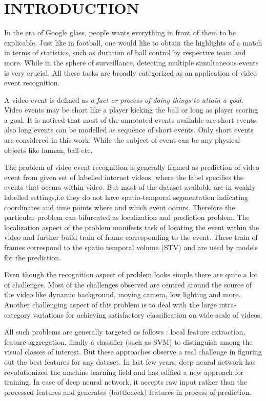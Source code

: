 \chapter{INTRODUCTION}
\label{chap:intro}
In the era of Google glass, people wants everything in front of them to be explicable. Just like in football, one would like to obtain the highlights of a match in terms of statistics, such as duration of ball control by respective team and more. While in the sphere of surveillance, detecting multiple simultaneous events is very crucial. All these tasks are broadly categorized as an application of video event recognition. 

\par A video event is defined as \textit{a fact or process of doing things to attain a goal}. Video events may be short like a player kicking the ball or  long as player scoring a goal. It is noticed that most of the annotated events available are short events, also long events can be modelled as sequence of short events. Only short events are considered in this work. While the subject of event can be any physical objects like human, ball etc.
\par The problem of video event recognition is generally framed as prediction of video event from given set of labelled internet videos, where the label specifies the events that occurs within video. But most of the dataset available are in weakly labelled settings,i.e they do not have spatio-temporal segmentation indicating coordinates and time points where and which event occurs.  
Therefore the particular problem can bifurcated as localization and prediction problem. The localization aspect of the problem manifests task of locating the event within the video  and further build train of frame corresponding to the event. These train of frames correspond to the spatio temporal volume (STV) and are used by models for the prediction.
\par Even though the recognition aspect of problem looks simple there are quite a lot of challenges. Most of the challenges observed are centred around the source of the video like dynamic background, moving camera, low lighting and more. Another challenging aspect of this problem is to deal with the large intra-category variations for achieving satisfactory classification on wide scale of videos.
\par All such problems are generally targeted as follows : local feature extraction, feature aggregation, finally a classifier (such as SVM) to distinguish among the visual classes of interest. But these approaches observe a real challenge in figuring out the best features for any dataset. In last few years, deep neural network has revolutionized the machine learning field and has edified a new approach for training. In case of deep neural network, it accepts raw input rather than the processed features and generates (bottleneck) features in process of prediction. 
